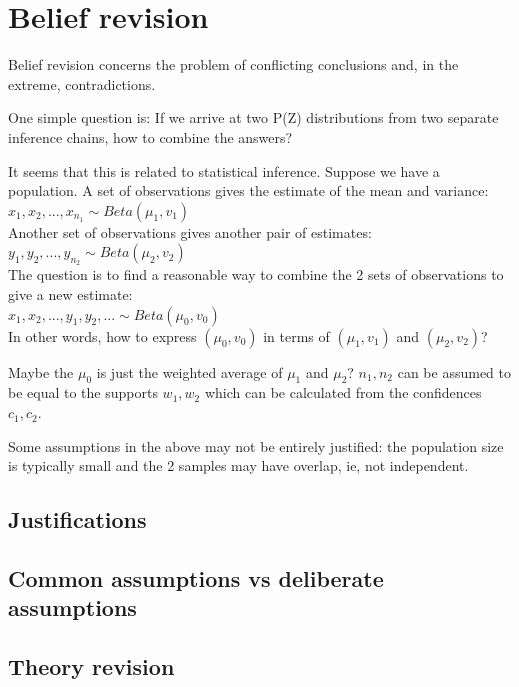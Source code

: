 \documentclass[a4paper]{report}
\begin{document}
\chapter{Belief revision}
\label{ch:belief-revision}
\minitoc

Belief revision concerns the problem of conflicting conclusions and, in the extreme, contradictions.

One simple question is:  If we arrive at two P(Z) distributions from two separate inference chains, how to combine the answers?

It seems that this is related to statistical inference.  Suppose we have a population.  A set of observations gives the estimate of the mean and variance:\\
\hspace*{1cm} $x_1, x_2, ..., x_{n_1} \sim Beta(\mu_1, v_1)$\\
Another set of observations gives another pair of estimates:\\
\hspace*{1cm} $y_1, y_2, ..., y_{n_2} \sim Beta(\mu_2, v_2)$\\
The question is to find a reasonable way to combine the 2 sets of observations to give a new estimate:\\
\hspace*{1cm} $x_1, x_2, ..., y_1, y_2, ... \sim Beta(\mu_0, v_0)$\\
In other words, how to express $(\mu_0, v_0)$ in terms of $(\mu_1, v_1)$ and $(\mu_2, v_2)$?

Maybe the $\mu_0$ is just the weighted average of $\mu_1$ and $\mu_2$?  $n_1, n_2$ can be assumed to be equal to the supports $w_1, w_2$ which can be calculated from the confidences $c_1, c_2$.

Some assumptions in the above may not be entirely justified:  the population size is typically small and the 2 samples may have overlap, ie, not independent.

\section{Justifications}

\section{Common assumptions vs deliberate assumptions}

\section{Theory revision}
\end{document}
